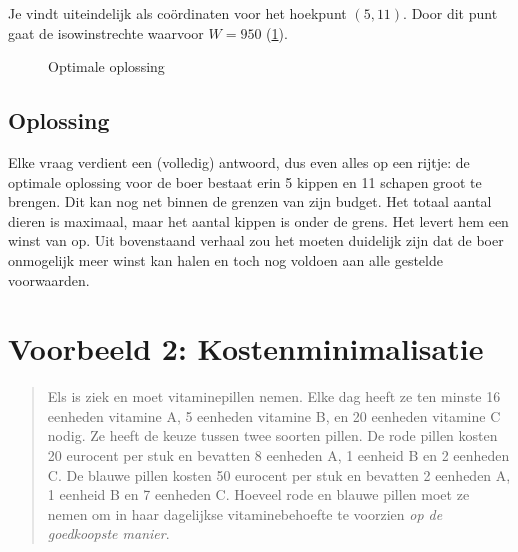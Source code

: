Je vindt uiteindelijk als co\"{o}rdinaten voor het hoekpunt $(5,
11)$. Door dit punt gaat de isowinstrechte waarvoor $W= 950$ (\cref{fig:maxwinstrechte}).
\begin{figure}[htbp]
    \centering
{}
     \caption{Optimale oplossing}
    \label{fig:maxwinstrechte}
\end{figure}




\subsection{Oplossing}
Elke vraag verdient een (volledig) antwoord, dus even alles op
een rijtje: de optimale oplossing voor de boer bestaat erin 5 kippen en 11
schapen groot te brengen. Dit kan nog net binnen de grenzen van
zijn budget. Het totaal aantal dieren is maximaal, maar het aantal kippen is onder de grens.
Het levert hem een winst van  op. Uit
bovenstaand verhaal zou het moeten duidelijk zijn dat de boer
onmogelijk meer winst kan halen en toch nog voldoen aan alle
gestelde voorwaarden.





\section{Voorbeeld 2: Kostenminimalisatie}\label{sec.minprob}

\begin{quote}
    Els is ziek en moet vitaminepillen nemen. Elke dag heeft ze ten minste
    16 eenheden vitamine A, 5 eenheden vitamine B, en 20 eenheden
    vitamine C nodig. Ze heeft de keuze tussen twee soorten pillen.
    De rode pillen kosten 20 eurocent per stuk en bevatten 8 eenheden
    A, 1 eenheid B en 2 eenheden C. De blauwe pillen kosten 50 eurocent
    per stuk en bevatten 2 eenheden A, 1 eenheid B en 7 eenheden
    C. Hoeveel rode en blauwe pillen moet ze nemen om in haar dagelijkse
    vitaminebehoefte te voorzien \emph{op de goedkoopste manier}.
\end{quote}



